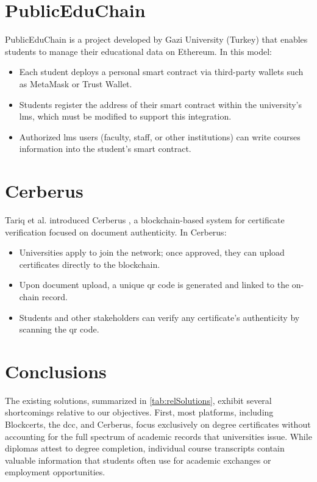 \section{PublicEduChain}
PublicEduChain \cite{mustafa2024publiceduchain} is a project developed by Gazi University (Turkey) that enables students to manage their educational data on Ethereum. In this model:
\begin{itemize}
    \item Each student deploys a personal smart contract via third-party wallets such as MetaMask or Trust Wallet.
    \item Students register the address of their smart contract within the university’s \gls{lms}, which must be modified to support this integration.
    \item Authorized \gls{lms} users (faculty, staff, or other institutions) can write courses information into the student’s smart contract.
\end{itemize}

\section{Cerberus}
Tariq et al. introduced Cerberus \cite{tariq2022cerberus}, a blockchain-based system for certificate verification focused on document authenticity. In Cerberus:
\begin{itemize}
    \item Universities apply to join the network; once approved, they can upload certificates directly to the blockchain.
    \item Upon document upload, a unique \gls{qr} code is generated and linked to the on-chain record.
    \item Students and other stakeholders can verify any certificate’s authenticity by scanning the \gls{qr} code.
\end{itemize}

\section{Conclusions}
The existing solutions, summarized in \cref{tab:relSolutions}, exhibit several shortcomings relative to our objectives. First, most platforms, including Blockcerts, the \gls{dcc}, and Cerberus, focus exclusively on degree certificates without accounting for the full spectrum of academic records that universities issue. While diplomas attest to degree completion, individual course transcripts contain valuable information that students often use for academic exchanges or employment opportunities.

